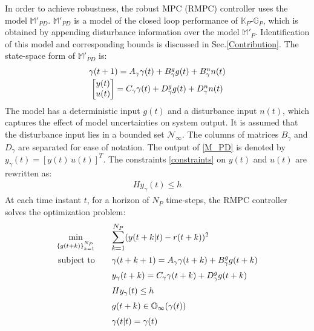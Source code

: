 \documentclass[letterpaper, 10 pt, conference]{ieeeconf}  %
\begin{document}
	In order to achieve robustness, the robust MPC (RMPC) controller uses the model $\mathbb{M}'_{PD}$. $\mathbb{M}'_{PD}$ is a model of the closed loop performance of $\mathbb{K}_P$-$\mathbb{G}_P$, which is obtained by appending disturbance information over the model $\mathbb{M}'_{P}$. Identification of this model and corresponding bounds is discussed in Sec.\ref{Contribution}. The state-space form of $\mathbb{M}'_{PD}$ is:
	\begin{equation}
	\begin{matrix}
	\gamma(t+1) = A_\gamma\gamma(t) + B^g_\gamma g(t) + B^n_\gamma n(t) \vspace{2pt}\\
	\begin{bmatrix}y(t)\\u(t)\end{bmatrix} = C_\gamma\gamma(t) + D^g_\gamma g(t) + D^n_\gamma n(t)
	\end{matrix}
	\label{M_PD}
	\end{equation}
	The model has a deterministic input $g(t)$ and a disturbance input $n(t)$, which captures the effect of model uncertainties on system output. It is assumed that the disturbance input lies in a bounded set $\mathcal{N}_{\infty}$.
	The columns of matrices $B_\gamma$ and $D_\gamma$ are separated for ease of notation. The output of \eqref{M_PD} is denoted by $y_{\gamma}(t)=[y(t) \hspace{2pt} u(t)]^T$. The constraints \eqref{constraints} on $y(t)$ and $u(t)$  are rewritten as: 
	\begin{equation*}
	\begin{matrix}
	Hy_{\gamma}(t) \leq h
	\end{matrix}
	\end{equation*}
	At each time instant $t$, for a horizon of $N_P$ time-steps, the RMPC controller solves the optimization problem:
	\begin{equation}
	\begin{aligned}
	 \underset{\{g(t+k)\}_{k=1}^{N_P}}{\text{min}}
	&  \hspace{20pt} \mathlarger{\sum\limits_{k=1}^{N_P}}(y(t+k|t)-r(t+k))^2 \\
	\text{subject to}
	& \hspace{20pt} \gamma(t+k+1) = A_\gamma\gamma(t+k) + B_\gamma^g g(t+k)\\
	& \hspace{20pt} y_{\gamma}(t+k) = C_\gamma\gamma(t+k) + D_\gamma^g g(t+k)\\
	& \hspace{20pt} Hy_{\gamma}(t) \leq h \\
	& \hspace{20pt}  g(t+k) \in \mathbb{O}_{\infty}(\gamma(t)) \\
	& \hspace{20pt} \gamma(t|t) = \gamma(t)
	\end{aligned}
	\label{RMPC}
	\end{equation}
\end{document}
